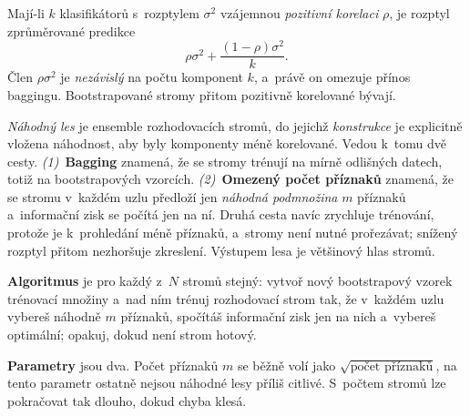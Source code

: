 \documentclass[11pt,a4paper]{article}
\theoremstyle{definition}
\begin{document}
\begin{defbox}
Mají-li $k$ klasifikátorů s~rozptylem $\sigma^2$ vzájemnou \emph{pozitivní korelaci} $\rho$,
je rozptyl zprůměrované predikce
\[ \rho\sigma^2+\frac{(1-\rho)\sigma^2}{k}. \]
Člen $\rho\sigma^2$ je \emph{nezávislý} na počtu komponent $k$, a~právě on omezuje přínos
baggingu. Bootstrapované stromy přitom pozitivně korelované bývají.

\emph{Náhodný les} je ensemble rozhodovacích stromů, do jejichž \emph{konstrukce} je
explicitně vložena náhodnost, aby byly komponenty méně korelované. Vedou k~tomu dvě cesty.
\emph{(1)}~\textbf{Bagging} znamená, že se stromy trénují na mírně odlišných datech, totiž na
bootstrapových vzorcích. \emph{(2)}~\textbf{Omezený počet příznaků} znamená, že se stromu
v~každém uzlu předloží jen \emph{náhodná podmnožina} $m$ příznaků a~informační zisk se počítá
jen na ní. Druhá cesta navíc zrychluje trénování, protože je k~prohledání méně příznaků,
a~stromy není nutné prořezávat; snížený rozptyl přitom nezhoršuje zkreslení. Výstupem lesa je
většinový hlas stromů.

\textbf{Algoritmus} je pro každý z~$N$ stromů stejný: vytvoř nový bootstrapový vzorek
trénovací množiny a~nad ním trénuj rozhodovací strom tak, že v~každém uzlu vybereš náhodně
$m$ příznaků, spočítáš informační zisk jen na nich a~vybereš optimální; opakuj, dokud není
strom hotový.

\textbf{Parametry} jsou dva. Počet příznaků $m$ se běžně volí jako
$\sqrt{\text{počet příznaků}}$, na tento parametr ostatně nejsou náhodné lesy příliš citlivé.
S~počtem stromů lze pokračovat tak dlouho, dokud chyba klesá.
\end{defbox}
\end{document}

